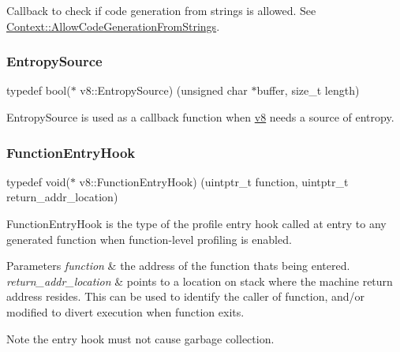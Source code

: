 Callback to check if code generation from strings is allowed. See \mbox{\hyperlink{classv8_1_1Context_a794ccc42113566f5d363f89c8b0d3c2c}{Context\+::\+Allow\+Code\+Generation\+From\+Strings}}. \mbox{\label{namespacev8_ab699f4bbbb56350e6e915682e420fcdc}} 
\subsubsection{\texorpdfstring{Entropy\+Source}{EntropySource}}
{\footnotesize\ttfamily typedef bool($\ast$ v8\+::\+Entropy\+Source) (unsigned char $\ast$buffer, size\+\_\+t length)}

Entropy\+Source is used as a callback function when \mbox{\hyperlink{namespacev8}{v8}} needs a source of entropy. \mbox{\label{namespacev8_aaf07fb6bb13f295da3c6568938b7dec5}} 
\subsubsection{\texorpdfstring{Function\+Entry\+Hook}{FunctionEntryHook}}
{\footnotesize\ttfamily typedef void($\ast$ v8\+::\+Function\+Entry\+Hook) (uintptr\+\_\+t function, uintptr\+\_\+t return\+\_\+addr\+\_\+location)}

Function\+Entry\+Hook is the type of the profile entry hook called at entry to any generated function when function-\/level profiling is enabled.


\begin{DoxyParams}{Parameters}
{\em function} & the address of the function that\textquotesingle{}s being entered. \\
\hline
{\em return\+\_\+addr\+\_\+location} & points to a location on stack where the machine return address resides. This can be used to identify the caller of {\ttfamily function}, and/or modified to divert execution when {\ttfamily function} exits.\\
\hline
\end{DoxyParams}
\begin{DoxyNote}{Note}
the entry hook must not cause garbage collection. 
\end{DoxyNote}
\mbox{\label{namespacev8_a66c854bc88d612ab4c65354bc0dc74a0}} 
